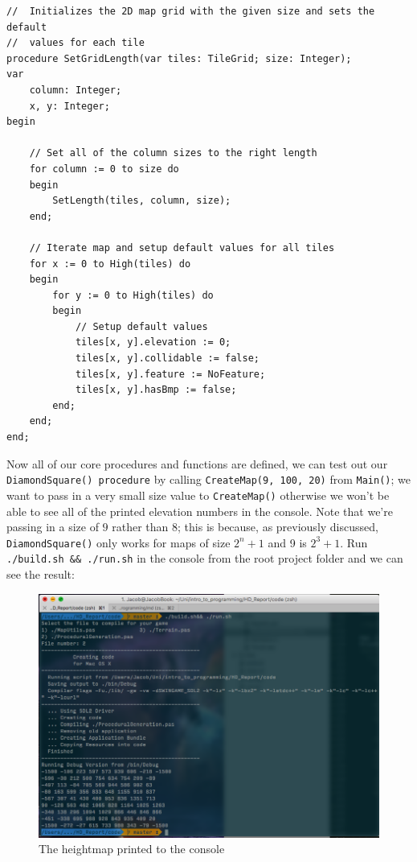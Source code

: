 \documentclass{article}
\begin{document}
\begin{verbatim}
//	Initializes the 2D map grid with the given size and sets the default 
//	values for each tile
procedure SetGridLength(var tiles: TileGrid; size: Integer);
var
	column: Integer;
	x, y: Integer;
begin

	// Set all of the column sizes to the right length
	for column := 0 to size do
	begin
		SetLength(tiles, column, size);
	end;

	// Iterate map and setup default values for all tiles
	for x := 0 to High(tiles) do
	begin
		for y := 0 to High(tiles) do
		begin
			// Setup default values
			tiles[x, y].elevation := 0;
			tiles[x, y].collidable := false;
			tiles[x, y].feature := NoFeature;
			tiles[x, y].hasBmp := false;
		end;
	end;
end;
\end{verbatim}

Now all of our core procedures and functions are defined, we can test out our \texttt{DiamondSquare() procedure} by calling \texttt{CreateMap(9, 100, 20)} from \texttt{Main()}; we want to pass in a very small size value to \texttt{CreateMap()} otherwise we won't be able to see all of the printed elevation numbers in the console. Note that we're passing in a size of $9$ rather than $8$; this is because, as previously discussed, \texttt{DiamondSquare()} only works for maps of size $2^{n}+1$ and 9 is $2^{3}+1$. Run \texttt{./build.sh && ./run.sh} in the console from the root project folder and we can see the result:

\begin{figure}[H]
	\centering
	\renewcommand{\figurename}{Example}
	\includegraphics[width=0.9\linewidth,trim=4 4 4 4,clip]{printtoconsole.png}
	\caption{The heightmap printed to the console}
\end{figure}
\end{document}
